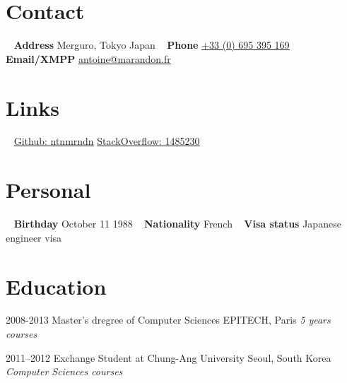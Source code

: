 \documentclass[]{template/friggeri-cv} %
\begin{document}


\begin{aside} %
\section{Contact}
~
\textbf{Address}
Merguro, Tokyo
Japan
~
\textbf{Phone}
\href{tel:0033695395169}{\underline{+33 (0) 695 395 169}}
~
\textbf{Email/XMPP}
\href{mailto:antoine@marandon.fr}{\underline{antoine@marandon.fr}}
\section {Links}
~
\href{https://github.com/ntnmrndn}{Github: \underline{ntnmrndn}}
\href{http://stackoverflow.com/users/1485230/}{StackOverflow: \underline{1485230}}
\section{Personal}
~
\textbf{Birthday}
October 11 1988
~
\textbf{Nationality}
French
~
\textbf{Visa status}
Japanese engineer visa
\end{aside}


\section{Education}

\begin{entrylist}


\entry
{2008-2013}
{Master's dregree {\normalfont of Computer Sciences}}
{EPITECH, Paris}
{\emph{5 years courses}}


\entry
{2011--2012}
{Exchange Student {\normalfont at Chung-Ang University}}
{Seoul, South Korea}
{\emph{Computer Sciences courses}}


\end{entrylist}
\end{document}
